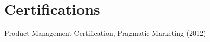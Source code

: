 \documentclass[letterpaper]{resume}
\begin{document}

\section{Certifications}

\vspace{1.0em}
\begin{compactitem}[\itembullet]
  \item Product Management Certification, Pragmatic Marketing (2012)
\end{compactitem}

\end{document}
